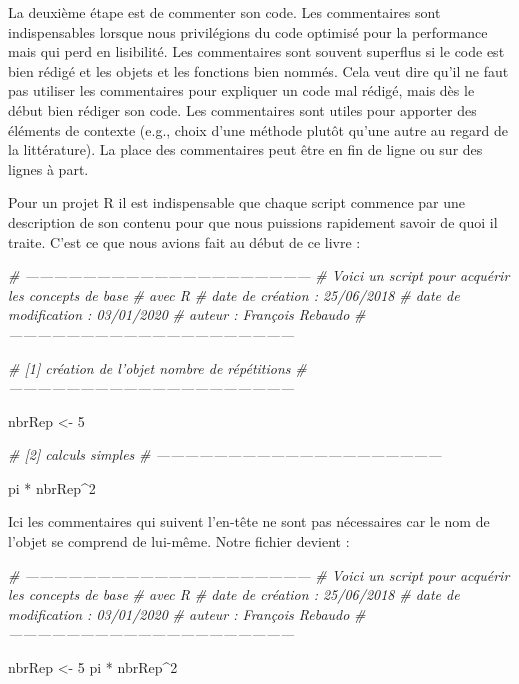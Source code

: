 \documentclass[twoside,symmetric]{book}
\newenvironment{Shaded}{}{}
\newcommand{\CommentTok}[1]{\textit{#1}}
\newcommand{\DecValTok}[1]{#1}
\newcommand{\NormalTok}[1]{#1}
\newcommand{\OperatorTok}[1]{#1}
\newcommand{\StringTok}[1]{#1}
\begin{document}
La deuxième étape est de commenter son code. Les commentaires sont indispensables lorsque nous privilégions du code optimisé pour la performance mais qui perd en lisibilité. Les commentaires sont souvent superflus si le code est bien rédigé et les objets et les fonctions bien nommés. Cela veut dire qu'il ne faut pas utiliser les commentaires pour expliquer un code mal rédigé, mais dès le début bien rédiger son code. Les commentaires sont utiles pour apporter des éléments de contexte (e.g., choix d'une méthode plutôt qu'une autre au regard de la littérature). La place des commentaires peut être en fin de ligne ou sur des lignes à part.

Pour un projet R il est indispensable que chaque script commence par une description de son contenu pour que nous puissions rapidement savoir de quoi il traite. C'est ce que nous avions fait au début de ce livre :

\begin{Shaded}
\begin{Highlighting}[]
\CommentTok{# ------------------------------------------------------------}
\CommentTok{# Voici un script pour acquérir les concepts de base }
\CommentTok{# avec R}
\CommentTok{# date de création : 25/06/2018}
\CommentTok{# date de modification : 03/01/2020}
\CommentTok{# auteur : François Rebaudo}
\CommentTok{# ------------------------------------------------------------}

\CommentTok{# [1] création de l'objet nombre de répétitions}
\CommentTok{# ------------------------------------------------------------}

\NormalTok{nbrRep <-}\StringTok{ }\DecValTok{5}

\CommentTok{# [2] calculs simples}
\CommentTok{# ------------------------------------------------------------}

\NormalTok{pi }\OperatorTok{*}\StringTok{ }\NormalTok{nbrRep}\OperatorTok{^}\DecValTok{2}
\end{Highlighting}
\end{Shaded}

Ici les commentaires qui suivent l'en-tête ne sont pas nécessaires car le nom de l'objet se comprend de lui-même. Notre fichier devient :

\begin{Shaded}
\begin{Highlighting}[]
\CommentTok{# ------------------------------------------------------------}
\CommentTok{# Voici un script pour acquérir les concepts de base }
\CommentTok{# avec R}
\CommentTok{# date de création : 25/06/2018}
\CommentTok{# date de modification : 03/01/2020}
\CommentTok{# auteur : François Rebaudo}
\CommentTok{# ------------------------------------------------------------}

\NormalTok{nbrRep <-}\StringTok{ }\DecValTok{5}
\NormalTok{pi }\OperatorTok{*}\StringTok{ }\NormalTok{nbrRep}\OperatorTok{^}\DecValTok{2}
\end{Highlighting}
\end{Shaded}
\end{document}
